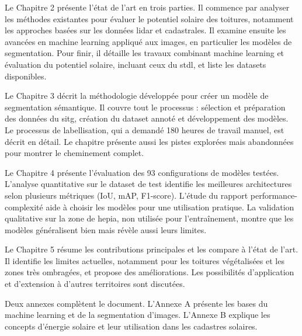 Le Chapitre 2 présente l'état de l'art en trois parties. Il commence par analyser les méthodes existantes pour évaluer le potentiel solaire des toitures, notamment les approches basées sur les données \gls{lidar} et cadastrales. Il examine ensuite les avancées en machine learning appliqué aux images, en particulier les modèles de segmentation. Pour finir, il détaille les travaux combinant machine learning et évaluation du potentiel solaire, incluant ceux du \gls{stdl}, et liste les datasets disponibles.

Le Chapitre 3 décrit la méthodologie développée pour créer un modèle de segmentation sémantique. Il couvre tout le processus : sélection et préparation des données du \gls{sitg}, création du dataset annoté et développement des modèles. Le processus de labellisation, qui a demandé 180 heures de travail manuel, est décrit en détail. Le chapitre présente aussi les pistes explorées mais abandonnées pour montrer le cheminement complet.

Le Chapitre 4 présente l'évaluation des 93 configurations de modèles testées. L'analyse quantitative sur le dataset de test identifie les meilleures architectures selon plusieurs métriques (IoU, mAP, F1-score). L'étude du rapport performance-complexité aide à choisir les modèles pour une utilisation pratique. La validation qualitative sur la zone de \gls{hepia}, non utilisée pour l'entraînement, montre que les modèles généralisent bien mais révèle aussi leurs limites.

Le Chapitre 5 résume les contributions principales et les compare à l'état de l'art. Il identifie les limites actuelles, notamment pour les toitures végétalisées et les zones très ombragées, et propose des améliorations. Les possibilités d'application et d'extension à d'autres territoires sont discutées.

Deux annexes complètent le document. L'Annexe A présente les bases du machine learning et de la segmentation d'images. L'Annexe B explique les concepts d'énergie solaire et leur utilisation dans les cadastres solaires.